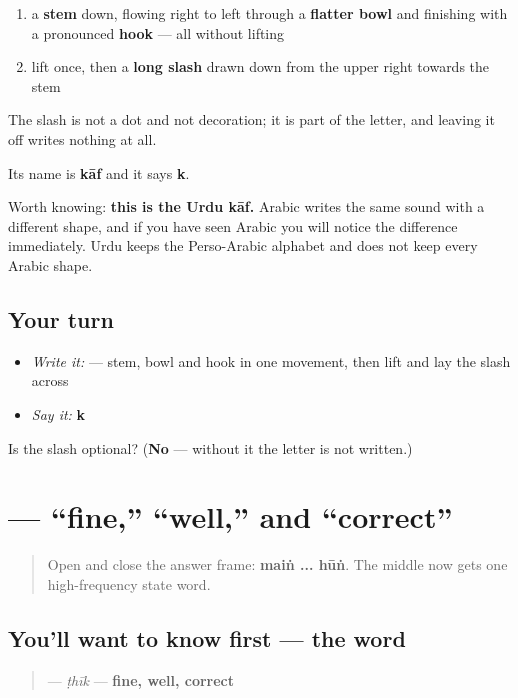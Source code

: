 \begin{enumerate}
\raggedright
  \item a \textbf{stem} down, flowing right to left through a \textbf{flatter bowl} and finishing with a pronounced \textbf{hook} — all without lifting
  \item lift once, then a \textbf{long slash} drawn down from the upper right towards the stem
\end{enumerate}

The slash is not a dot and not decoration; it is part of the letter, and leaving it off writes nothing at all.

Its name is \textbf{kāf} and it says \textbf{k}.

Worth knowing: \textbf{this is the Urdu kāf.} Arabic writes the same sound with a different shape, and if you have seen Arabic you will notice the difference immediately. Urdu keeps the Perso-Arabic alphabet and does not keep every Arabic shape.

\subsection*{Your turn}
\begin{itemize}
\raggedright
  \item \emph{Write it:}  — stem, bowl and hook in one movement, then lift and lay the slash across
  \item \emph{Say it:} \textbf{k}
\end{itemize}

\begin{tcolorbox}[breakable,colback=teal!4,colframe=teal!35!black,title={Before you move on}]
Is the slash optional? (\textbf{No} — without it the letter is not written.)
\end{tcolorbox}
\section[\texorpdfstring{\ur{ٹھیک} (ṭhīk)}{ٹھیک (ṭhīk)}]{ — “fine,” “well,” and “correct”}

\label{lesson:UR-C04-thik}



\begin{quote}
Open and close the answer frame: \textbf{maiṅ ... hūṅ}. The middle now gets one high-frequency state word.
\end{quote}

\subsection*{You'll want to know first — the word}
\begin{quote}
\textbf{} — \emph{ṭhīk} — \textbf{fine, well, correct}
\end{quote}

